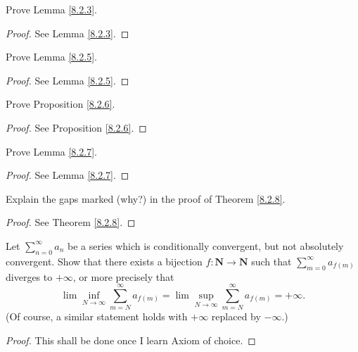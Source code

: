 \exercisesection

\begin{exercise}\label{ex 8.2.1}
    Prove Lemma \ref{8.2.3}.
\end{exercise}

\begin{proof}
    See Lemma \ref{8.2.3}.
\end{proof}

\begin{exercise}\label{ex 8.2.2}
    Prove Lemma \ref{8.2.5}.
\end{exercise}

\begin{proof}
    See Lemma \ref{8.2.5}.
\end{proof}

\begin{exercise}\label{ex 8.2.3}
    Prove Proposition \ref{8.2.6}.
\end{exercise}

\begin{proof}
    See Proposition \ref{8.2.6}.
\end{proof}

\begin{exercise}\label{ex 8.2.4}
    Prove Lemma \ref{8.2.7}.
\end{exercise}

\begin{proof}
    See Lemma \ref{8.2.7}.
\end{proof}

\begin{exercise}\label{ex 8.2.5}
    Explain the gaps marked (why?) in the proof of Theorem \ref{8.2.8}.
\end{exercise}

\begin{proof}
    See Theorem \ref{8.2.8}.
\end{proof}

\begin{exercise}\label{ex 8.2.6}
    Let \(\sum_{n = 0}^\infty a_n\) be a series which is conditionally convergent, but not absolutely convergent.
    Show that there exists a bijection \(f : \mathbf{N} \to \mathbf{N}\) such that \(\sum_{m = 0}^\infty a_{f(m)}\) diverges to \(+\infty\), or more precisely that
    \[
        \lim\inf_{N \to \infty} \sum_{m = N}^\infty a_{f(m)} = \lim\sup_{N \to \infty} \sum_{m = N}^\infty a_{f(m)} = +\infty.
    \]
    (Of course, a similar statement holds with \(+\infty\) replaced by \(-\infty\).)
\end{exercise}

\begin{proof}
    This shall be done once I learn Axiom of choice.
\end{proof}